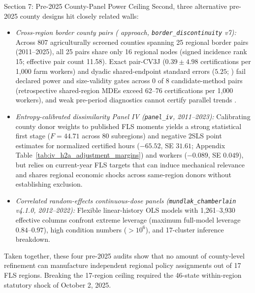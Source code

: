 \begin{llmdraft}{Section 7: Pre-2025 County-Panel Power Ceiling}
Second, three alternative pre-2025 county designs hit closely related walls:
\begin{itemize}
  \item \emph{Cross-region border county pairs (\citealp{dube_lester_reich_2010}
    approach, \texttt{border\_discontinuity} v7):} Across 807 agriculturally screened
    counties spanning 25 regional border pairs (2011--2025), all 25 pairs share
    only 16 regional nodes (signed incidence rank 15; effective pair count
    11.58). Exact pair-CV3J ($0.39 \pm 4.98$ certifications per 1,000 farm
    workers) and dyadic shared-endpoint standard errors ($5.25$;
    \citealp{aronow_samii_assenova_2015}) fail declared power and size-validity
    gates across 0 of 8 candidate-method pairs (retrospective shared-region
    MDEs exceed 62--76 certifications per 1,000 workers), and weak pre-period
    diagnostics cannot certify parallel trends \citep{roth_2022}.
  \item \emph{Entropy-calibrated dissimilarity Panel IV (\texttt{panel\_iv},
    2011--2023):} Calibrating county donor weights to published FLS moments
    yields a strong statistical first stage ($F = 44.71$ across 80 subregions)
    and negative 2SLS point estimates for normalized certified hours
    ($-65.52$, SE $31.61$; Appendix Table~\ref{tab:iv_h2a_adjustment_margins})
    and workers ($-0.089$, SE $0.049$), but relies on current-year FLS targets
    that can induce mechanical relevance and shares regional economic shocks
    across same-region donors without establishing exclusion.
  \item \emph{Correlated random-effects continuous-dose panels
    (\texttt{mundlak\_chamberlain} v4.1.0, 2012--2022):} Flexible linear-history OLS
    models with 1,261--3,930 effective columns confront extreme leverage
    (maximum full-model leverage $0.84$--$0.97$), high condition numbers
    ($>10^6$), and 17-cluster inference breakdown.
\end{itemize}
Taken together, these four pre-2025 audits show that no amount of county-level
refinement can manufacture independent regional policy assignments out of 17
FLS regions. Breaking the 17-region ceiling required the 46-state within-region
statutory shock of October 2, 2025.
\end{llmdraft}

